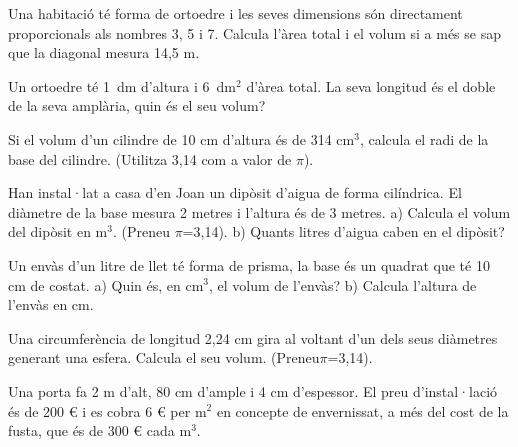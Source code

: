 \begin{activitats}
\begin{mylist}

\exer  Una habitació té forma de ortoedre i les seves dimensions són directament proporcionals als nombres 3, 5 i 7. Calcula l'àrea total i el volum si a més se sap que la diagonal mesura 14,5 m.


\exer  Un ortoedre té 1~dm d'altura i 6~dm${}^{2}$ d'àrea total. La seva longitud és el doble de la seva amplària, quin és el seu volum?


\exer  Si el volum d'un cilindre de 10 cm d'altura és de 314 cm${}^{3}$, calcula el radi de la base del cilindre. (Utilitza 3,14 com a valor de $\pi$).

 
\exer  Han instal·lat a casa d'en Joan un dipòsit d'aigua de forma cilíndrica. El diàmetre de la base mesura 2 metres i l'altura és de 3 metres. a) Calcula el volum del dipòsit en m${}^{ 3}$. (Preneu $\pi$=3,14). b) Quants litres d'aigua caben en el dipòsit?

\answers[cols=1]{[$V=3\pi=9.4247$ m$^3$, $9424.8$ litres]}

\exer  Un envàs d'un litre de llet té forma de prisma, la base és un quadrat que té 10 cm de costat. a) Quin és, en cm${}^{3}$, el volum de l'envàs? b) Calcula l'altura de l'envàs en cm.

\answers[cols=1]{[$1$ l = $1000$ cm$^3$, l'altura és 10 cm (és un cub)]}

\exer  Una circumferència de longitud 2,24 cm gira al voltant d'un dels seus diàmetres generant una esfera. Calcula el seu volum. (Preneu$\pi$=3,14).


\exer  Una porta fa 2 m d'alt, 80 cm d'ample i 4 cm d'espessor. El preu d'instal·lació és de 200 \euro{} i es cobra 6 \euro{} per m${}^{2}$ en concepte de envernissat, a més del cost de la fusta, que és de 300 \euro{} cada m${}^{ 3}$.


\end{mylist}
\end{activitats}
